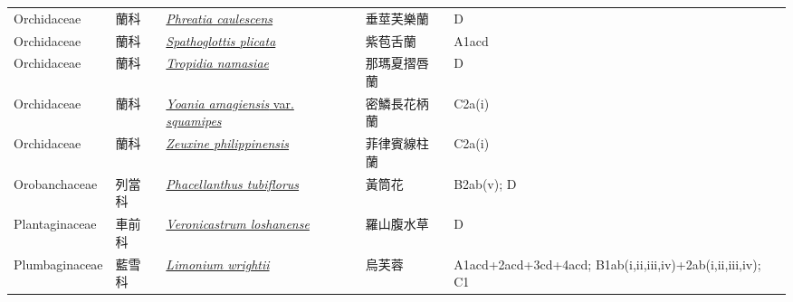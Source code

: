 {\begin{longtable}{L{2.5cm}L{2cm}L{5cm}L{2.5cm}L{3cm}}
    Orchidaceae & 蘭科 & \href{http://www.theplantlist.org/tpl1.1/search?q=Phreatia+caulescens}{\textit{Phreatia caulescens} } & 垂莖芙樂蘭 & D    \\
    Orchidaceae & 蘭科 & \href{http://www.theplantlist.org/tpl1.1/search?q=Spathoglottis+plicata}{\textit{Spathoglottis plicata} } & 紫苞舌蘭 & A1acd    \\
    Orchidaceae & 蘭科 & \href{http://www.theplantlist.org/tpl1.1/search?q=Tropidia+namasiae}{\textit{Tropidia namasiae} } & 那瑪夏摺唇蘭 & D    \\
    Orchidaceae & 蘭科 & \href{http://www.theplantlist.org/tpl1.1/search?q=Yoania+amagiensis+var.+squamipes}{\textit{Yoania amagiensis} var. \textit{squamipes} } & 密鱗長花柄蘭 & C2a(i)    \\
    Orchidaceae & 蘭科 & \href{http://www.theplantlist.org/tpl1.1/search?q=Zeuxine+philippinensis}{\textit{Zeuxine philippinensis} } & 菲律賓線柱蘭 & C2a(i)    \\
    Orobanchaceae & 列當科 & \href{http://www.theplantlist.org/tpl1.1/search?q=Phacellanthus+tubiflorus}{\textit{Phacellanthus tubiflorus} } & 黃筒花 & B2ab(v); D    \\
    Plantaginaceae & 車前科 & \href{http://www.theplantlist.org/tpl1.1/search?q=Veronicastrum+loshanense}{\textit{Veronicastrum loshanense} } & 羅山腹水草 & D    \\
    Plumbaginaceae & 藍雪科 & \href{http://www.theplantlist.org/tpl1.1/search?q=Limonium+wrightii}{\textit{Limonium wrightii} } & 烏芙蓉 & A1acd+2acd+3cd+4acd; B1ab(i,ii,iii,iv)+2ab(i,ii,iii,iv); C1    \\

\end{longtable}}
